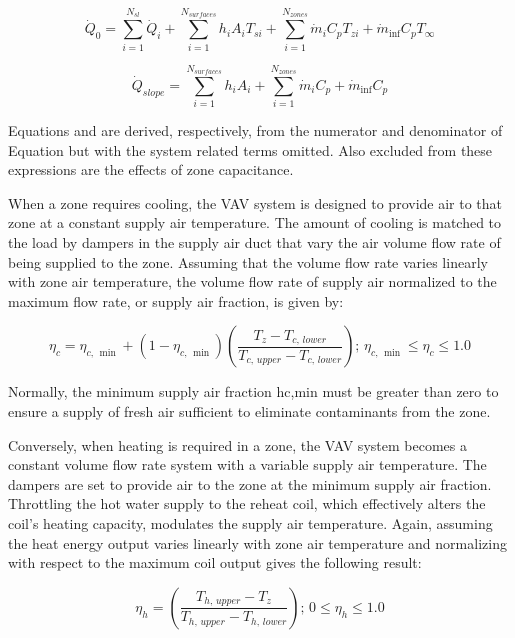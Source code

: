 \begin{equation}
{\dot Q_0} = \sum\limits_{i = 1}^{{N_{sl}}} {{{\dot Q}_i}}  + \sum\limits_{i = 1}^{{N_{surfaces}}} {{h_i}} {A_i}{T_{si}} + \sum\limits_{i = 1}^{{N_{zones}}} {{{\dot m}_i}} {C_p}{T_{zi}} + {\dot m_{\inf }}{C_p}{T_\infty }
\end{equation}

\begin{equation}
{\dot Q_{slope}} = \sum\limits_{i = 1}^{{N_{surfaces}}} {{h_i}} {A_i} + \sum\limits_{i = 1}^{{N_{zones}}} {{{\dot m}_i}} {C_p} + {\dot m_{\inf }}{C_p}
\end{equation}

Equations and are derived, respectively, from the numerator and denominator of Equation but with the system related terms omitted. Also excluded from these expressions are the effects of zone capacitance.

When a zone requires cooling, the VAV system is designed to provide air to that zone at a constant supply air temperature. The amount of cooling is matched to the load by dampers in the supply air duct that vary the air volume flow rate of being supplied to the zone. Assuming that the volume flow rate varies linearly with zone air temperature, the volume flow rate of supply air normalized to the maximum flow rate, or supply air fraction, is given by:

\begin{equation}
{\eta_c} = {\eta_{c,\,\min }} + \left( {1 - {\eta_{c,\,\min }}} \right)\left( {\frac{{{T_z} - {T_{c,\,lower}}}}{{{T_{c,\,upper}} - {T_{c,\,lower}}}}} \right);\,{\eta_{c,\,\min }} \le {\eta_c} \le 1.0
\end{equation}

Normally, the minimum supply air fraction hc,min must be greater than zero to ensure a supply of fresh air sufficient to eliminate contaminants from the zone.

Conversely, when heating is required in a zone, the VAV system becomes a constant volume flow rate system with a variable supply air temperature. The dampers are set to provide air to the zone at the minimum supply air fraction. Throttling the hot water supply to the reheat coil, which effectively alters the coil's heating capacity, modulates the supply air temperature. Again, assuming the heat energy output varies linearly with zone air temperature and normalizing with respect to the maximum coil output gives the following result:

\begin{equation}
{\eta_h} = \left( {\frac{{{T_{h,\,upper}} - {T_z}}}{{{T_{h,\,upper}} - {T_{h,\,lower}}}}} \right);\,0 \le {\eta_h} \le 1.0
\end{equation}

